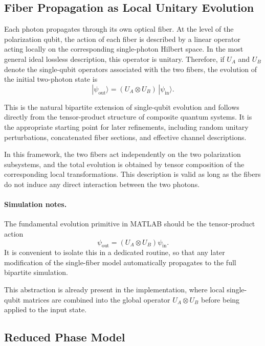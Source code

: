\documentclass[a4paper]{article}
\begin{document}
\subsection{Fiber Propagation as Local Unitary Evolution}

Each photon propagates through its own optical fiber. At the level of the polarization qubit, the action of each fiber is described by a linear operator acting locally on the corresponding single-photon Hilbert space. In the most general ideal lossless description, this operator is unitary. Therefore, if \(U_A\) and \(U_B\) denote the single-qubit operators associated with the two fibers, the evolution of the initial two-photon state is
\[
|\psi_{\mathrm{out}}\rangle
=
(U_A \otimes U_B)\, |\psi_{\mathrm{in}}\rangle.
\]

This is the natural bipartite extension of single-qubit evolution and follows directly from the tensor-product structure of composite quantum systems. It is the appropriate starting point for later refinements, including random unitary perturbations, concatenated fiber sections, and effective channel descriptions.

In this framework, the two fibers act independently on the two polarization subsystems, and the total evolution is obtained by tensor composition of the corresponding local transformations. This description is valid as long as the fibers do not induce any direct interaction between the two photons.

\paragraph{Simulation notes.}
The fundamental evolution primitive in MATLAB should be the tensor-product action
\[
\psi_{\mathrm{out}} = (U_A \otimes U_B)\psi_{\mathrm{in}}.
\]
It is convenient to isolate this in a dedicated routine, so that any later modification of the single-fiber model automatically propagates to the full bipartite simulation.

This abstraction is already present in the implementation, where local single-qubit matrices are combined into the global operator \(U_A \otimes U_B\) before being applied to the input state.


\subsection{Reduced Phase Model}
\end{document}
